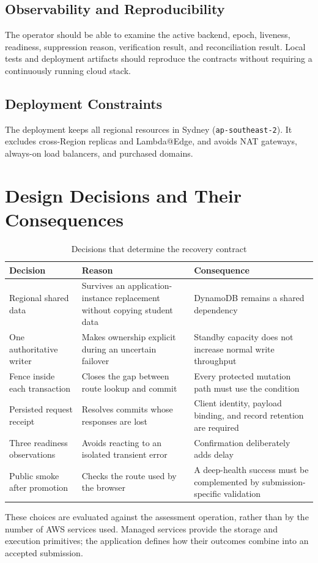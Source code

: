 \subsection{Observability and Reproducibility}
The operator should be able to examine the active backend, epoch, liveness, readiness, suppression reason, verification result, and reconciliation result. Local tests and deployment artifacts should reproduce the contracts without requiring a continuously running cloud stack.
\subsection{Deployment Constraints}
The deployment keeps all regional resources in Sydney (\texttt{ap-southeast-2}). It excludes cross-Region replicas and Lambda@Edge, and avoids NAT gateways, always-on load balancers, and purchased domains.

\section{Design Decisions and Their Consequences}
\begin{table}[H]\centering\small
\caption{Decisions that determine the recovery contract}\label{tab:design-decisions}
\begin{tabularx}{\textwidth}{@{}L{32mm}YY@{}}\toprule
\textbf{Decision} & \textbf{Reason} & \textbf{Consequence}\\\midrule
Regional shared data & Survives an application-instance replacement without copying student data & DynamoDB remains a shared dependency\\
One authoritative writer & Makes ownership explicit during an uncertain failover & Standby capacity does not increase normal write throughput\\
Fence inside each transaction & Closes the gap between route lookup and commit & Every protected mutation path must use the condition\\
Persisted request receipt & Resolves commits whose responses are lost & Client identity, payload binding, and record retention are required\\
Three readiness observations & Avoids reacting to an isolated transient error & Confirmation deliberately adds delay\\
Public smoke after promotion & Checks the route used by the browser & A deep-health success must be complemented by submission-specific validation\\\bottomrule
\end{tabularx}\end{table}

These choices are evaluated against the assessment operation, rather than by the number of AWS services used. Managed services provide the storage and execution primitives; the application defines how their outcomes combine into an accepted submission.

